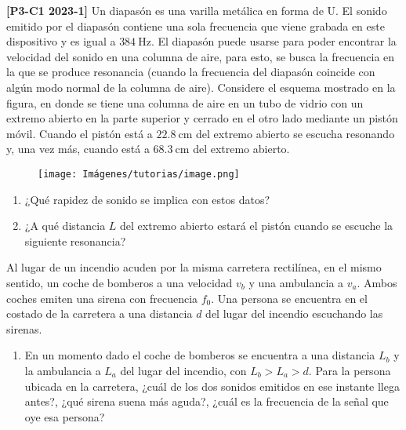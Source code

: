 \documentclass[letterpaper,11pt]{article}
\begin{document}
\begin{enumerate}\setlength{\itemsep}{0.4cm}


\begin{minipage}{0.65\linewidth}
    \item \textbf{[P3-C1 2023-1]} Un diapasón es una varilla metálica en forma de U. El sonido emitido por el diapasón contiene una sola frecuencia que viene grabada en este dispositivo y es igual a $\SI{384}{\Hz}$. El diapasón puede usarse para poder encontrar la velocidad del sonido en una columna de aire, para esto, se busca la frecuencia en la que se produce resonancia (cuando la frecuencia del diapasón coincide con algún modo normal de la columna de aire). Considere el esquema mostrado en la figura, en donde se tiene una columna de aire en un tubo de vidrio con un extremo abierto en la parte superior y cerrado en el otro lado mediante un pistón móvil. Cuando el pistón está a $\SI{22.8}{\cm}$ del extremo abierto se escucha resonando y, una vez más, cuando está a $\SI{68.3}{\cm}$ del extremo abierto.
\end{minipage}
\hfill
\begin{minipage}{0.3\linewidth}
    \begin{figure}[H]
        \centering
        \texttt{[image: Imágenes/tutorias/image.png]}
    \end{figure}
\end{minipage}
\begin{enumerate}
    \item ¿Qué rapidez de sonido se implica con estos datos?
    \item ¿A qué distancia $L$ del extremo abierto estará el pistón cuando se escuche la siguiente resonancia?
\end{enumerate}

\item Al lugar de un incendio acuden por la misma carretera rectilínea, en el mismo sentido, un coche de bomberos a una velocidad $v_b$ y una ambulancia a $v_a$. Ambos coches emiten una sirena con frecuencia $f_0$. Una persona se encuentra en el costado de la carretera a una distancia $d$ del lugar del incendio escuchando las sirenas.

\begin{enumerate}
    \item En un momento dado el coche de bomberos se encuentra a una distancia $L_b$ y la ambulancia a $L_a$ del lugar del incendio, con $L_b > L_a > d$. Para la persona ubicada en la carretera, ¿cuál de los dos sonidos emitidos en ese instante llega antes?, ¿qué sirena suena más aguda?, ¿cuál es la frecuencia de la señal que oye esa persona?


\end{enumerate}
\end{enumerate}
\end{document}
